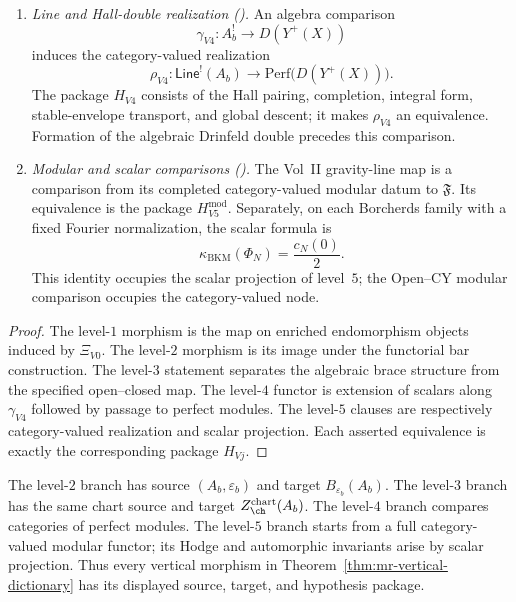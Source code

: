 \begin{theorem}
\begin{enumerate}[label=\textup{(V\arabic*)}]
\item \emph{Line and Hall-double realization
(\ClaimStatusConjectured).}
An algebra comparison
\[
 \gamma_{V4}\colon A_b^!\longrightarrow D(Y^+(X))
\]
induces the category-valued realization
\[
 \rho_{V4}\colon\mathsf{Line}^{!}(A_b)\longrightarrow
 \mathrm{Perf}\bigl(D(Y^+(X))\bigr).
\]
The package $H_{V4}$ consists of the Hall pairing, completion,
integral form, stable-envelope transport, and global descent; it makes
$\rho_{V4}$ an equivalence.  Formation of the algebraic Drinfeld
double precedes this comparison.

\item \emph{Modular and scalar comparisons
(\ClaimStatusConditional).}
The Vol~II gravity-line map is a comparison from its completed
category-valued modular datum to $\mathfrak F$.  Its equivalence is the
package $H_{V5}^{\mathrm{mod}}$.  Separately, on each Borcherds family
with a fixed Fourier normalization, the scalar formula is
\[
 \kappa_{\mathrm{BKM}}(\Phi_N)=\frac{c_N(0)}2.
\]
This identity occupies the scalar projection of level~$5$; the
Open--CY modular comparison occupies the category-valued node.
\end{enumerate}
\end{theorem}

\begin{proof}
The level-$1$ morphism is the map on enriched endomorphism objects
induced by $\Xi_{V0}$.  The level-$2$ morphism is its image under the
functorial bar construction.  The level-$3$ statement separates the
algebraic brace structure from the specified open--closed map.  The
level-$4$ functor is extension of scalars along $\gamma_{V4}$ followed
by passage to perfect modules.  The level-$5$ clauses are respectively
category-valued realization and scalar projection.  Each asserted
equivalence is exactly the corresponding package $H_{Vj}$.
\end{proof}

\begin{remark}
\label{rem:mr-not-identified}
The level-$2$ branch has source $(A_b,\varepsilon_b)$ and target
$B_{\varepsilon_b}(A_b)$.  The level-$3$ branch has the same chart
source and target $Z_{\ch}^{\mathrm{chart}}(A_b)$.  The level-$4$
branch compares categories of perfect modules.  The level-$5$ branch
starts from a full category-valued modular functor; its Hodge and
automorphic invariants arise by scalar projection.  Thus every
vertical morphism in Theorem~\ref{thm:mr-vertical-dictionary} has its
displayed source, target, and hypothesis package.
\end{remark}

